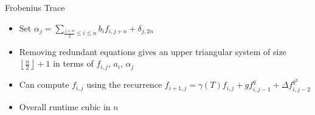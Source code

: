 \documentclass{beamer}
\begin{document}




\begin{frame}{Frobenius Trace}

\begin{itemize}

        \item Set $\alpha_j = \sum_{\frac{j+n}{2} \leq i \leq n} b_i f_{i,j + n} + \delta_{j,2n}$
    \item Removing redundant equations gives an upper triangular system of size $\left\lfloor \frac{n}{2} \right\rfloor + 1$ in terms of $f_{i,j}$, $a_i$, $\alpha_j$
    \item Can compute $f_{i,j}$ using the recurrence $f_{i+1,j} = \gamma(T) f_{i,j} + g f_{i,j-1}^q + \Delta f_{i,j-2}^{q^2}$

\item Overall runtime cubic in $n$

\end{itemize}

    
\end{frame}
\end{document}
